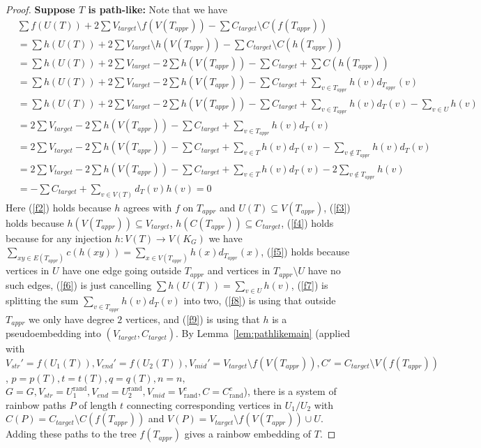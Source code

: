 \documentclass[a4paper,11pt,hidelinks]{amsart}
\theoremstyle{definition}
\begin{document}
\begin{proof}
\textbf{Suppose $T$ is path-like:} 
 Note that we have 
\begin{align}
&\sum f(U(T))+2\sum  V_{target}\setminus f(V(T_{appr})) -\sum C_{target}\setminus C(f(T_{appr}))\label{f1}\\
&= \sum h(U(T))+2\sum  V_{target}\setminus h(V(T_{appr})) -\sum C_{target}\setminus C(h(T_{appr}))\label{f2}\\
&= \sum h(U(T))+2\sum  V_{target} -2\sum h(V(T_{appr}))-\sum C_{target}+\sum C(h(T_{appr}))\label{f3}\\
&= \sum h(U(T))+2\sum  V_{target} -2\sum h(V(T_{appr}))-\sum C_{target}+\sum_{v\in T_{appr}} h(v)d_{T_{appr}}(v)\label{f4}\\
&= \sum h(U(T))+2\sum  V_{target} -2\sum h(V(T_{appr}))-\sum C_{target}+\sum_{v\in T_{appr}} h(v)d_{T}(v)- \sum_{v\in U} h(v)\label{f5}\\
&=2\sum  V_{target} -2\sum h(V(T_{appr}))-\sum C_{target}+\sum_{v\in T_{appr}} h(v)d_{T}(v)\label{f6}\\
&=2\sum  V_{target} -2\sum h(V(T_{appr}))-\sum C_{target}+\sum_{v\in T} h(v)d_{T}(v)-\sum_{v\not\in T_{appr}} h(v)d_{T}(v)\label{f7}\\
&=2\sum  V_{target} -2\sum h(V(T_{appr}))-\sum C_{target}+\sum_{v\in T} h(v)d_{T}(v)-2\sum_{v\not\in T_{appr}} h(v)\label{f8}\\
&=-\sum C_{target}+\sum_{v\in V(T)}d_T(v)h(v)
=0\label{f9}
\end{align}
Here (\ref{f2}) holds because $h$ agrees with $f$ on $T_{appr}$ and $U(T) \subseteq V(T_{appr})$, (\ref{f3}) holds because $h(V(T_{appr}))\subseteq V_{target}$, $h(C(T_{appr}))\subseteq C_{target}$, (\ref{f4}) holds because for any injection $h: V(T)\to V(K_G)$ we have $\sum_{xy\in E(T_{appr})} c(h(xy))=\sum_{x\in V(T_{appr})}h(x)d_{T_{appr}}(x)$, (\ref{f5}) holds because vertices in $U$ have one edge going outside $T_{appr}$ and vertices in $T_{appr}\setminus U$ have no such edges, (\ref{f6}) is just cancelling $\sum h(U(T))=\sum_{v\in U}h(v)$, (\ref{f7}) is splitting the sum $\sum_{v\in T_{appr}}h(v)d_T(v)$ into two, (\ref{f8}) is using that outside $T_{appr}$ we only have degree $2$ vertices, and (\ref{f9}) is using that $h$ is a pseudoembedding into $(V_{target}, C_{target})$.
 By Lemma~\ref{lem:pathlikemain} (applied with $V_{str}'=f(U_1(T)), V_{end}'=f(U_2(T)), V_{mid}'=V_{target}\setminus f(V(T_{appr})), C'=C_{target}\setminus V(f(T_{appr}))$, $p=p(T), t=t(T), q=q(T), n=n,$ $G=G,  V_{str}=U_1^{\mathrm{rand}},  V_{end}=U_2^{\mathrm{rand}}, V_{mid}=V_{\mathrm{rand}}^c, C=C_{\mathrm{rand}}^c$), there is a system of rainbow paths $P$ of length $t$ connecting corresponding vertices in $U_1/U_2$ with $C(P)=C_{target}\setminus C(f(T_{appr}))$ and $V(P)=V_{target}\setminus f(V(T_{appr}))\cup U$. Adding these paths to the tree $f(T_{appr})$ gives a rainbow embedding of $T$.
 \end{proof}
\end{document}
